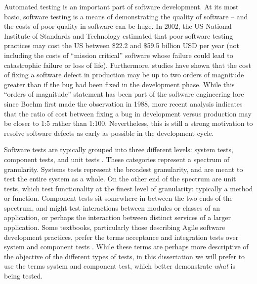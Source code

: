 Automated testing is an important part of software development. At its
most basic, software testing is a means of demonstrating the quality
of software -- and the costs of poor quality in software can be
huge. In 2002, the US National Institute of Standards and Technology
estimated that poor software testing practices may cost the US between
\$22.2 and \$59.5 billion USD per year (not including the costs of
``mission critical'' software whose failure could lead to catastrophic
failure or loss of life). Furthermore, studies have shown that the
cost of fixing a software defect in production may be up to two orders
of magnitude greater than if the bug had been fixed in the development
phase. \cite{mcconnell:code} \cite{boehm:understanding} While this
``orders of magnitude'' statement has been part of the software
engineering lore since Boehm first made the observation in 1988, more
recent analysis \cite{boehm:software} \cite{bossavit:leprechauns}
indicates that the ratio of cost between fixing a bug in development
versus production may be closer to 1:5 rather than
1:100. Nevertheless, this is still a strong motivation to resolve
software defects as early as possible in the development cycle.








Software tests are typically grouped into three different levels:
system tests, component tests, and unit tests \cite{XXX}. These %
categories represent a spectrum of granularity. Systems tests
represent the broadest granularity, and are meant to test the entire
system as a whole. On the other end of the spectrum are unit tests,
which test functionality at the finest level of granularity: typically
a method or function. Component tests sit somewhere in between the two
ends of the spectrum, and might test interactions between modules or
classes of an application, or perhaps the interaction between distinct
services of a larger application. Some textbooks, particularly those
describing Agile software development practices, prefer the terms
acceptance and integration tests over system and component tests
\cite{freeman:growing} \cite{humble:continuous}. While these terms are
perhaps more descriptive of the objective of the different types of
tests, in this dissertation we will prefer to use the terms system and
component test, which better demonstrate {\em what} is being tested.

